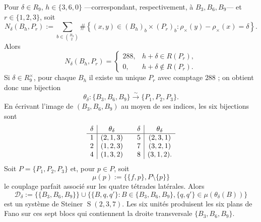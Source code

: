 \begin{theorem}
\label{thm:semillas-seis-fano-fase-rev3}
Pour \(\delta\in R_9\), \(h\in\{3,6,0\}\) ---correspondant,
respectivement, à \(B_3,B_6,B_9\)--- et \(r\in\{1,2,3\}\), soit
\begin{equation}
 N_\delta(B_h,P_r)
 :=\sum_{b\in\binom{R_9}{2}}
 \#\left\{(x,y)\in(B_h)_b\times(P_r)_b:
 \rho_\times(y)-\rho_\times(x)=\delta\right\}.
 \label{eq:conteo-incidencia-fano-semillas-rev3}
\end{equation}
Alors
\begin{equation}
 N_\delta(B_h,P_r)=
 \begin{cases}
 288,&h+\delta\in R(P_r),\\
 0,&h+\delta\notin R(P_r).
 \end{cases}
 \label{eq:conteo-288-cero-fano-semillas-rev3}
\end{equation}
Si \(\delta\in R_9^\times\), pour chaque \(B_h\) il existe un unique \(P_r\)
avec comptage \(288\) ; on obtient donc une bijection
\[
 \theta_\delta:\{B_3,B_6,B_9\}
 \xrightarrow{\sim}\{P_1,P_2,P_3\}.
\]
En écrivant l'image de \((B_3,B_6,B_9)\) au moyen de ses indices, les six
bijections sont
\begin{equation}
 \begin{array}{c|c@{\qquad}c|c}
 \delta&\theta_\delta&\delta&\theta_\delta\\
 \hline
 1&(2,1,3)&5&(2,3,1)\\
 2&(1,2,3)&7&(3,2,1)\\
 4&(1,3,2)&8&(3,1,2).
 \end{array}
 \label{eq:tabla-theta-delta-fano-semillas-rev3}
\end{equation}
Soit \(P=\{P_1,P_2,P_3\}\) et, pour \(p\in P\), soit
\[
 \mu(p):=\bigl\{\{f,p\},P\setminus\{p\}\bigr\}
\]
le couplage parfait associé sur les quatre tétrades latérales.
Alors
\begin{equation}
 \mathcal D_\delta
 :=\bigl\{\{B_3,B_6,B_9\}\bigr\}
 \cup
 \bigl\{\{B,q,q'\}:B\in\{B_3,B_6,B_9\},
       \{q,q'\}\in\mu(\theta_\delta(B))\bigr\}
 \label{eq:sistema-fano-semillas-rev3}
\end{equation}
est un système de Steiner \(\operatorname{S}(2,3,7)\). Les six unités
produisent les six plans de Fano sur ces sept blocs qui contiennent la
droite transversale \(\{B_3,B_6,B_9\}\).
\end{theorem}

